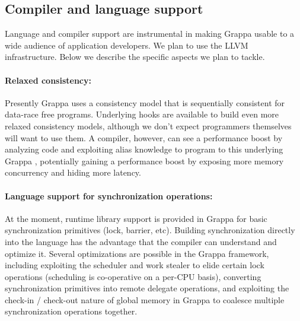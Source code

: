 

\subsection{Compiler and language support}

Language and compiler support are instrumental in making Grappa usable to a
wide audience of application developers. We plan to use the LLVM~\cite{llvm}
infrastructure. Below we describe the specific aspects we plan to tackle.


\paragraph{Relaxed consistency:} Presently Grappa uses a consistency model that is sequentially consistent for data-race free programs.  Underlying hooks are available to build even more relaxed consistency models, although we don't expect programmers themselves will want to use them.  A compiler, however, can see a performance boost by analyzing code and exploiting alias knowledge to program to this underlying Grappa \api, potentially gaining a performance boost by exposing more memory concurrency and hiding more latency.

\paragraph{Language support for synchronization operations: } At the moment, runtime library support is provided in Grappa for basic synchronization primitives (lock, barrier, etc).  Building synchronization directly into the language has the advantage that the compiler can understand and optimize it.  Several optimizations are possible in the Grappa framework, including exploiting the scheduler and work stealer to elide certain lock operations (scheduling is co-operative on a per-CPU basis), converting synchronization primitives into remote delegate operations, and exploiting the check-in / check-out nature of global memory in Grappa to coalesce multiple synchronization operations together.

